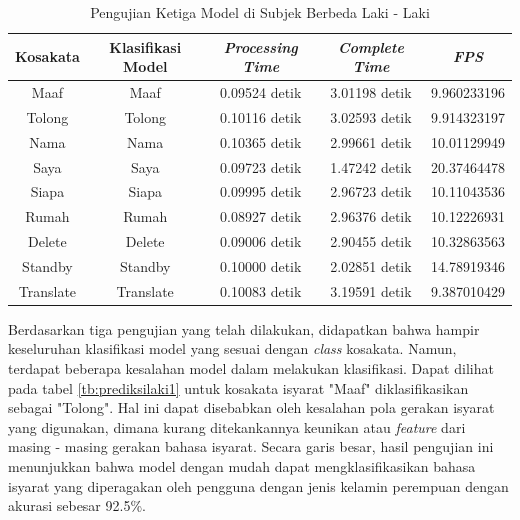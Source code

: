 \newpage
\begin{longtable}{|c|c|c|c|c|}
  \caption{Pengujian Ketiga Model di Subjek Berbeda Laki - Laki}
  \label{tb:prediksilaki3}                                   \\
  \hline
  \rowcolor[HTML]{C0C0C0}
  \textbf{Kosakata} & \textbf{Klasifikasi Model} & \textbf{\emph{Processing Time}} & \textbf{\emph{Complete Time}} & \textbf{\emph{FPS}}\\
  \hline
  Maaf              & Maaf                          & 0.09524 detik                           & 3.01198 detik                                  & 9.960233196\\
  Tolong            & Tolong                        & 0.10116 detik                           & 3.02593 detik                                  & 9.914323197\\
  Nama              & Nama                          & 0.10365 detik                           & 2.99661 detik                                  & 10.01129949\\
  Saya              & Saya                          & 0.09723 detik                           & 1.47242 detik                                  & 20.37464478\\
  Siapa             & Siapa                         & 0.09995 detik                           & 2.96723 detik                                  & 10.11043536\\
  Rumah             & Rumah                         & 0.08927 detik                           & 2.96376 detik                                  & 10.12226931\\
  Delete            & Delete                        & 0.09006 detik                           & 2.90455 detik                                  & 10.32863563\\
  Standby           & Standby                       & 0.10000 detik                           & 2.02851 detik                                  & 14.78919346\\
  Translate         & Translate                     & 0.10083 detik                           & 3.19591 detik                                  & 9.387010429\\
  \hline
\end{longtable}



Berdasarkan tiga pengujian yang telah dilakukan, didapatkan bahwa hampir keseluruhan klasifikasi model yang sesuai dengan \emph{class} kosakata. Namun, terdapat beberapa kesalahan model dalam melakukan klasifikasi. Dapat dilihat pada tabel \ref{tb:prediksilaki1} untuk kosakata isyarat "Maaf" diklasifikasikan sebagai "Tolong". Hal ini dapat disebabkan oleh kesalahan pola gerakan isyarat yang digunakan, dimana kurang ditekankannya keunikan atau \emph{feature} dari masing - masing gerakan bahasa isyarat.  Secara garis besar, hasil pengujian ini menunjukkan bahwa model dengan mudah dapat mengklasifikasikan bahasa isyarat yang diperagakan oleh pengguna dengan jenis kelamin perempuan dengan akurasi sebesar 92.5\%. 

